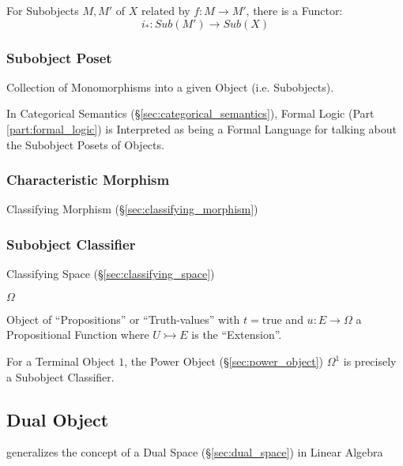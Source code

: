 For Subobjects $M,M'$ of $X$ related by $f : M \rightarrow M'$, there
is a Functor:
\[
  i_* : Sub (M') \rightarrow Sub (X)
\]



\subsubsection{Subobject Poset}\label{sec:subobject_poset}

Collection of Monomorphisms into a given Object (i.e. Subobjects).

In Categorical Semantics (\S\ref{sec:categorical_semantics}), Formal
Logic (Part \ref{part:formal_logic}) is Interpreted as being a Formal
Language for talking about the Subobject Posets of Objects.



\subsubsection{Characteristic Morphism}
\label{sec:characteristic_morphism}

Classifying Morphism (\S\ref{sec:classifying_morphism})



\subsubsection{Subobject Classifier}\label{sec:subobject_classifier}

Classifying Space (\S\ref{sec:classifying_space})

$\Omega$

Object of ``Propositions'' or ``Truth-values'' with $t =
\mathrm{true}$ and $u : E \rightarrow \Omega$ a Propositional Function
where $U \rightarrowtail E$ is the ``Extension''.

For a Terminal Object $1$, the Power Object (\S\ref{sec:power_object})
$\Omega^1$ is precisely a Subobject Classifier.



\subsection{Dual Object}\label{sec:dual_object}

generalizes the concept of a Dual Space (\S\ref{sec:dual_space}) in
Linear Algebra

